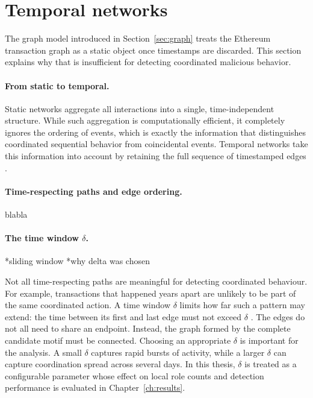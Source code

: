 \section{Temporal networks}
\label{sec:temporal_networks}
The graph model introduced in Section~\ref{sec:graph} treats the Ethereum transaction graph as a static object once timestamps are discarded. This section explains why that is insufficient for detecting coordinated malicious behavior.

\paragraph{From static to temporal.}
Static networks aggregate all interactions into a single, time-independent structure. While such aggregation is computationally efficient, it completely ignores the ordering of events, which is exactly the information that distinguishes coordinated sequential behavior from coincidental events. Temporal networks take this information into account by retaining the full sequence of timestamped edges \citep{kovanen2011temporal, paranjape2017motifs}.

\paragraph{Time-respecting paths and edge ordering.}
blabla


\paragraph{The time window $\delta$.}
*sliding window
*why delta was chosen

Not all time-respecting paths are meaningful for detecting coordinated behaviour. For example, transactions that happened years apart are unlikely to be part of the same coordinated action. A time window $\delta$ limits how far such a pattern may extend: the time between its first and last edge must not exceed $\delta$ \citep{kovanen2011temporal, paranjape2017motifs}. The edges do not all need to share an endpoint. Instead, the graph formed by the complete candidate motif must be connected. Choosing an appropriate $\delta$ is important for the analysis. A small $\delta$ captures rapid bursts of activity, while a larger $\delta$ can capture coordination spread across several days. In this thesis, $\delta$ is treated as a configurable parameter whose effect on local role counts and detection performance is evaluated in Chapter~\ref{ch:results}.

